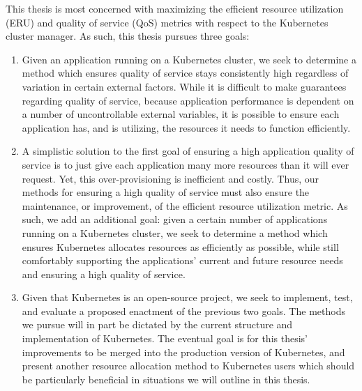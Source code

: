 This thesis is most concerned with maximizing the efficient resource utilization
(ERU) and quality of service (QoS) metrics with respect to the Kubernetes cluster manager.
As such, this thesis pursues three goals:

\begin{enumerate}
  \item Given an application running on a Kubernetes cluster, we seek to
    determine a method which ensures quality of
    service stays consistently high regardless of variation in
    certain external factors. While it is
    difficult to make guarantees regarding quality of service, because
    application performance is dependent on a number of uncontrollable
    external variables, it is possible to
    ensure each application has, and is utilizing, the resources it needs to
    function efficiently.
  \item A simplistic solution to the first goal of ensuring a high application
    quality of service is to just give each application many more resources than
    it will ever request. Yet, this over-provisioning is inefficient and costly. Thus, our
    methods for ensuring a high quality of service must also ensure the
    maintenance, or improvement, of the efficient resource utilization metric.
    As such, we add an additional goal: given a certain number of applications
    running on a Kubernetes cluster,
    we seek to determine a method which ensures Kubernetes allocates resources
    as efficiently as possible, while still comfortably
    supporting the applications' current and future resource needs and
    ensuring a high quality of service.
  \item Given that Kubernetes is an open-source project, we seek to implement, test, and
    evaluate a proposed enactment of the previous two goals.
    The methods we pursue will
    in part be dictated by the current structure and implementation of
    Kubernetes. The eventual goal is for this
    thesis' improvements to be merged into the production version of Kubernetes,
    and present another resource allocation method to Kubernetes users which
    should be particularly beneficial in situations we will outline in this
    thesis.
\end{enumerate}

